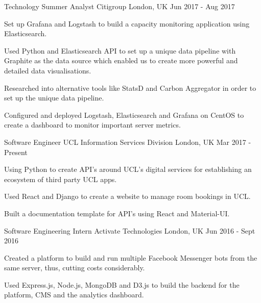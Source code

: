 

\begin{cventries}

\cventry
  {Technology Summer Analyst}
  {Citigroup}
  {London, UK}
  {Jun 2017 - Aug 2017}
  {
  \begin{cvitems}
    \item {Set up Grafana and Logstash to build a capacity monitoring application
      using Elasticsearch.}
    \item {Used Python and Elasticsearch API to set up a unique data pipeline
      with Graphite as the data source which enabled us to create more powerful
      and detailed data visualisations.}
    \item {Researched into alternative tools like StatsD and Carbon Aggregator
      in order to set up the unique data pipeline.}
    \item {Configured and deployed Logstash, Elasticsearch and Grafana on CentOS to create
      a dashboard to monitor important server metrics.}
  \end{cvitems}
  }


\cventry
  {Software Engineer}
  {UCL Information Services Division}
  {London, UK}
  {Mar 2017 - Present}
  {
  \begin{cvitems}
    \item {Using Python to create API's around UCL's digital services for establishing an ecosystem of third party UCL apps.}
    \item {Used React and Django to create a website to manage room bookings in UCL.}
    \item {Built a documentation template for API's using React and Material-UI.}
  \end{cvitems}
  }


\cventry
  {Software Engineering Intern}
  {Activate Technologies}
  {London, UK}
  {Jun 2016 - Sept 2016}
  {
    \begin{cvitems}
      \item {Created a platform to build and run multiple Facebook Messenger
        bots from the same server, thus, cutting costs considerably.}
      \item {Used Express.js, Node.js, MongoDB and D3.js to build the backend
        for the platform, CMS and the analytics dashboard.}
    \end{cvitems}
  }


\end{cventries}
